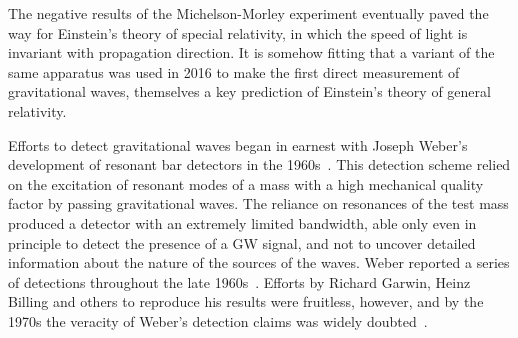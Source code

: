 The negative results of the Michelson-Morley experiment eventually paved the way for Einstein's theory of special 
relativity, in which the speed of light is invariant with propagation direction. It is somehow fitting that a variant 
of the same apparatus was used in 2016 to make the first direct measurement of gravitational waves, themselves 
a key prediction of Einstein's theory of general relativity. 


Efforts to detect gravitational waves began in earnest with Joseph Weber's development of resonant bar detectors 
in the 1960s~\cite{Weber_1968}. This detection scheme relied on the excitation of resonant modes of a mass with a high mechanical 
quality factor by passing gravitational waves. The reliance on resonances of the test mass produced a detector 
with an extremely limited bandwidth, able only even in principle to detect the presence of a GW signal, and not 
to uncover detailed information about the nature of the sources of the waves. 
Weber reported a series of detections throughout the late 1960s~\cite{Weber_1969}. Efforts by Richard Garwin, Heinz Billing and others 
to reproduce his results were fruitless, however, and by the 1970s the veracity of Weber's detection claims was widely doubted~\cite{Garwin_1973, Kafka_1978}. 

